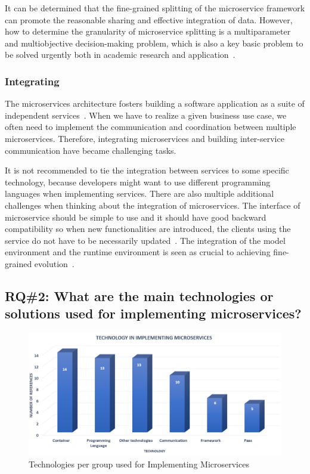 It can be determined that the fine-grained splitting of the microservice framework can promote the reasonable sharing and effective integration of data. However, how to determine the granularity of microservice splitting is a multiparameter and multiobjective decision-making problem, which is also a key basic problem to be solved urgently both in academic research and application~\cite{Yan2020}.


\subsubsection{Integrating}%

The microservices architecture fosters building a software application as a suite of independent services~\cite{rosa2018}. When we have to realize a given business use case, we often need to implement the communication and coordination between multiple microservices. Therefore, integrating microservices and building inter-service communication have became challenging tasks. 

\par It is not recommended to tie the integration between services to some specific technology, because developers might want to use different programming languages when implementing services. 
There are also multiple additional challenges when thinking about the integration of microservices. The interface of microservice should be simple to use and it should have good backward compatibility so when new functionalities are introduced, the clients using the service do not have to be necessarily updated~\cite{liu2018, Zhang2019, Kalske2017}. The integration of the model environment and the runtime environment is seen as crucial to achieving fine-grained evolution~\cite{overeem2018}.




\subsection{RQ\#2: What are the main technologies or solutions used for implementing microservices?}\label{sec:results-rq2}

\begin{figure}[h]
	\centering
	\includegraphics[width=0.5\linewidth]{images/commtechother.png}
	\caption{Technologies per group used for Implementing Microservices}
	\label{fig:tech-group}
\end{figure}	

